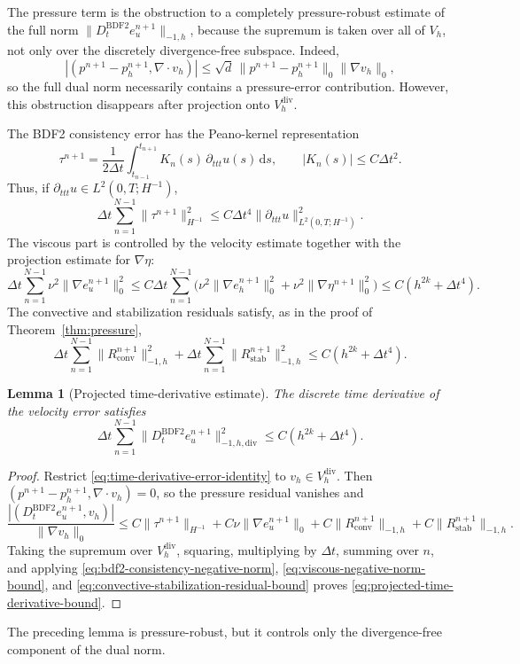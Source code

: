 \documentclass[11pt]{article}
\newtheorem{lemma}{Lemma}
\theoremstyle{remark}\newtheorem{remark}{Remark}
\newcommand{\dd}{\mathrm{d}}
\newcommand{\Vh}{V_h}\newcommand{\Qh}{Q_h}
\newcommand{\Vdivh}{V_h^{\mathrm{div}}}
\newcommand{\Dt}{D_t^{\mathrm{BDF2}}}
\theoremstyle{plain}
\begin{document}
The pressure term is the obstruction to a completely pressure-robust estimate of the full norm $\|\Dt e_u^{n+1}\|_{-1,h}$, because the supremum is taken over all of $\Vh$, not only over the discretely divergence-free subspace. Indeed,
\[
|(p^{n+1}-p_h^{n+1},\nabla\cdot v_h)|\le\sqrt d\,\|p^{n+1}-p_h^{n+1}\|_0\|\nabla v_h\|_0,
\]
so the full dual norm necessarily contains a pressure-error contribution. However, this obstruction disappears after projection onto $\Vdivh$.

The BDF2 consistency error has the Peano-kernel representation
\[
\tau^{n+1}=\frac1{2\Delta t}\int_{t_{n-1}}^{t_{n+1}}K_n(s)\,\partial_{ttt}u(s)\,\dd s,\qquad |K_n(s)|\le C\Delta t^2.
\]
Thus, if $\partial_{ttt}u\in L^2(0,T;H^{-1})$,
\begin{equation}\label{eq:bdf2-consistency-negative-norm}
\Delta t\sum_{n=1}^{N-1}\|\tau^{n+1}\|_{H^{-1}}^2\le C\Delta t^4\|\partial_{ttt}u\|_{L^2(0,T;H^{-1})}^2.
\end{equation}
The viscous part is controlled by the velocity estimate together with the projection estimate for $\nabla\eta$:
\begin{equation}\label{eq:viscous-negative-norm-bound}
\Delta t\sum_{n=1}^{N-1}\nu^2\|\nabla e_u^{n+1}\|_0^2\le C\Delta t\sum_{n=1}^{N-1}\big(\nu^2\|\nabla e_h^{n+1}\|_0^2+\nu^2\|\nabla\eta^{n+1}\|_0^2\big)\le C(h^{2k}+\Delta t^4).
\end{equation}
The convective and stabilization residuals satisfy, as in the proof of Theorem~\ref{thm:pressure},
\begin{equation}\label{eq:convective-stabilization-residual-bound}
\Delta t\sum_{n=1}^{N-1}\|R^{n+1}_{\mathrm{conv}}\|_{-1,h}^2+\Delta t\sum_{n=1}^{N-1}\|R^{n+1}_{\mathrm{stab}}\|_{-1,h}^2\le C(h^{2k}+\Delta t^4).
\end{equation}
\begin{lemma}[Projected time-derivative estimate]\label{lem:projected-time-derivative}
The discrete time derivative of the velocity error satisfies
\begin{equation}\label{eq:projected-time-derivative-bound}
\Delta t\sum_{n=1}^{N-1}\|\Dt e_u^{n+1}\|_{-1,h,\mathrm{div}}^2\le C(h^{2k}+\Delta t^4).
\end{equation}
\end{lemma}
\begin{proof}
Restrict \eqref{eq:time-derivative-error-identity} to $v_h\in\Vdivh$. Then $(p^{n+1}-p_h^{n+1},\nabla\cdot v_h)=0$, so the pressure residual vanishes and
\[\frac{|(\Dt e_u^{n+1},v_h)|}{\|\nabla v_h\|_0}\le C\|\tau^{n+1}\|_{H^{-1}}+C\nu\|\nabla e_u^{n+1}\|_0+C\|R_{\mathrm{conv}}^{n+1}\|_{-1,h}+C\|R_{\mathrm{stab}}^{n+1}\|_{-1,h}.\]
Taking the supremum over $\Vdivh$, squaring, multiplying by $\Delta t$, summing over $n$, and applying \eqref{eq:bdf2-consistency-negative-norm}, \eqref{eq:viscous-negative-norm-bound}, and \eqref{eq:convective-stabilization-residual-bound} proves \eqref{eq:projected-time-derivative-bound}.
\end{proof}
The preceding lemma is pressure-robust, but it controls only the divergence-free component of the dual norm.
\end{document}

